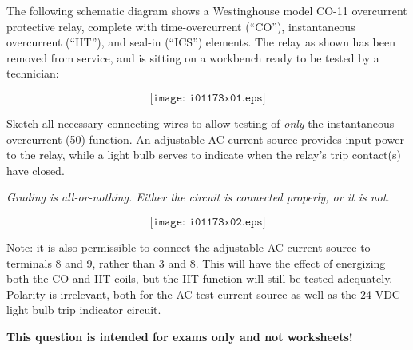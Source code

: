 

The following schematic diagram shows a Westinghouse model CO-11 overcurrent protective relay, complete with time-overcurrent (``CO''), instantaneous overcurrent (``IIT''), and seal-in (``ICS'') elements.  The relay as shown has been removed from service, and is sitting on a workbench ready to be tested by a technician:

$$\texttt{[image: i01173x01.eps]}$$

Sketch all necessary connecting wires to allow testing of {\it only} the instantaneous overcurrent (50) function.  An adjustable AC current source provides input power to the relay, while a light bulb serves to indicate when the relay's trip contact(s) have closed.







{\it Grading is all-or-nothing.  Either the circuit is connected properly, or it is not.}  

$$\texttt{[image: i01173x02.eps]}$$

Note: it is also permissible to connect the adjustable AC current source to terminals 8 and 9, rather than 3 and 8.  This will have the effect of energizing both the CO and IIT coils, but the IIT function will still be tested adequately.  Polarity is irrelevant, both for the AC test current source as well as the 24 VDC light bulb trip indicator circuit.
 






{\bf This question is intended for exams only and not worksheets!}



